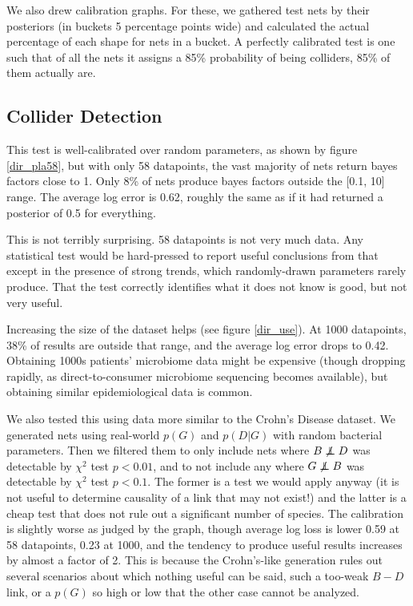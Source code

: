 \documentclass[letterpaper]{article}
\newcommand\indep{\protect\mathpalette{\protect\independenT}{\perp}}
\def\independenT#1#2{\mathrel{\rlap{$#1#2$}\mkern2mu{#1#2}}}
\begin{document}
We also drew calibration graphs.  For these, we gathered test nets by
their posteriors (in buckets 5 percentage points wide) and calculated
the actual percentage of each shape for nets in a bucket.  A perfectly
calibrated test is one such that of all the nets it assigns a 85\%
probability of being colliders, 85\% of them actually are.

\subsection{Collider Detection}

This test is well-calibrated over random parameters, as shown by
figure \ref{dir_pla58}, but with only 58 datapoints, the vast majority
of nets return bayes factors close to 1.  Only 8\% of nets produce
bayes factors outside the [0.1, 10] range.  The average log error is
0.62, roughly the same as if it had returned a posterior of 0.5 for
everything.

This is not terribly surprising.  58 datapoints is not very much
data.  Any statistical test would be hard-pressed to report useful
conclusions from that except in the presence of strong trends, which
randomly-drawn parameters rarely produce.  That the test correctly
identifies what it does not know is good, but not very useful.

Increasing the size of the dataset helps (see figure \ref{dir_use}).
At 1000 datapoints, 38\% of results are outside that range, and the
average log error drops to 0.42. Obtaining 1000s patients'
microbiome data might be expensive (though dropping rapidly, as
direct-to-consumer microbiome sequencing becomes available), but
obtaining similar epidemiological data is common.

We also tested this using data more similar to the Crohn's Disease
dataset.  We generated nets using real-world $p(G)$ and $p(D|G)$ with
random bacterial parameters.  Then we filtered them to only include
nets where $B \not\indep D$ was detectable by $\chi^2$ test $p<0.01$,
and to not include any where $G \not\indep B$ was detectable by
$\chi^2$ test $p<0.1$.  The 
former is a test we would apply anyway (it is not useful to determine
causality of a link that may not exist!) and the latter is a cheap
test that does not rule out a significant number of species.  The
calibration is slightly worse as judged by the graph, though average
log loss is lower 0.59 at 58 datapoints, 0.23 at 1000, and the
tendency to produce useful results increases by almost a factor of 2.
This is because the Crohn's-like generation rules out several
scenarios about which nothing useful can be said, such a too-weak
$B-D$ link, or a $p(G)$ so high or low that the other case cannot be
analyzed.
\end{document}
